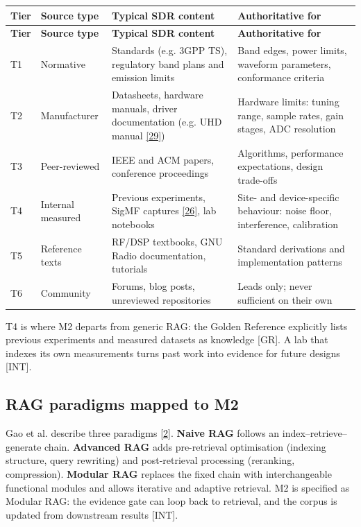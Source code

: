 \documentclass[11pt,a4paper]{article}
\newcommand{\prov}[1]{\textsf{\footnotesize[#1]}}
\begin{document}
{\small
\begin{longtable}{>{\raggedright\arraybackslash}p{}>{\raggedright\arraybackslash}p{}>{\raggedright\arraybackslash}p{}>{\raggedright\arraybackslash}p{}}
\toprule
\rowcolor{headbg} \textbf{Tier} & \textbf{Source type} & \textbf{Typical SDR content} & \textbf{Authoritative for} \\
\midrule
\endfirsthead
\toprule
\rowcolor{headbg} \textbf{Tier} & \textbf{Source type} & \textbf{Typical SDR content} & \textbf{Authoritative for} \\
\midrule
\endhead
\bottomrule
\endlastfoot
T1 & Normative & Standards (e.g. 3GPP TS), regulatory band plans and emission limits & Band edges, power limits, waveform parameters, conformance criteria \\ \arrayrulecolor{rulec}\hline\arrayrulecolor{black}
T2 & Manufacturer & Datasheets, hardware manuals, driver documentation (e.g. UHD manual \hyperlink{ref29}{[29]}) & Hardware limits: tuning range, sample rates, gain stages, ADC resolution \\ \arrayrulecolor{rulec}\hline\arrayrulecolor{black}
T3 & Peer-reviewed & IEEE and ACM papers, conference proceedings & Algorithms, performance expectations, design trade-offs \\ \arrayrulecolor{rulec}\hline\arrayrulecolor{black}
T4 & Internal measured & Previous experiments, SigMF captures \hyperlink{ref26}{[26]}, lab notebooks & Site- and device-specific behaviour: noise floor, interference, calibration \\ \arrayrulecolor{rulec}\hline\arrayrulecolor{black}
T5 & Reference texts & RF/DSP textbooks, GNU Radio documentation, tutorials & Standard derivations and implementation patterns \\ \arrayrulecolor{rulec}\hline\arrayrulecolor{black}
T6 & Community & Forums, blog posts, unreviewed repositories & Leads only; never sufficient on their own \\
\end{longtable}
}
T4 is where M2 departs from generic RAG: the Golden Reference explicitly lists previous experiments and measured datasets as knowledge \prov{GR}. A lab that indexes its own measurements turns past work into evidence for future designs \prov{INT}.

\subsection{RAG paradigms mapped to M2}
Gao et al. describe three paradigms \hyperlink{ref2}{[2]}. \textbf{Naive RAG} follows an index--retrieve--generate chain. \textbf{Advanced RAG} adds pre-retrieval optimisation (indexing structure, query rewriting) and post-retrieval processing (reranking, compression). \textbf{Modular RAG} replaces the fixed chain with interchangeable functional modules and allows iterative and adaptive retrieval. M2 is specified as Modular RAG: the evidence gate can loop back to retrieval, and the corpus is updated from downstream results \prov{INT}.
\end{document}
